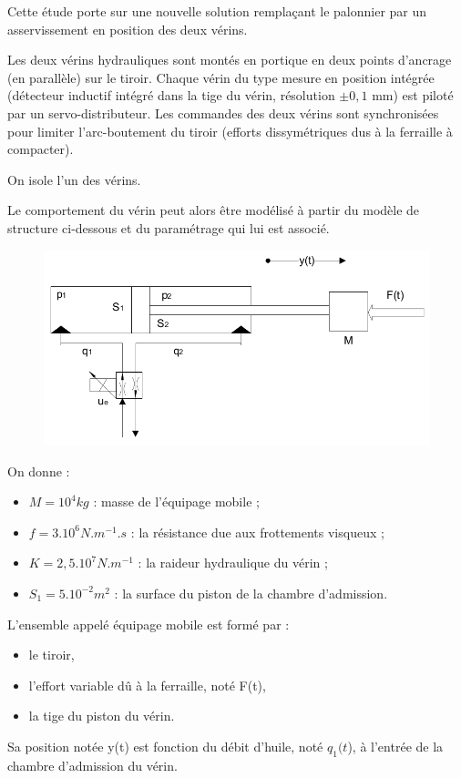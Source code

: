 Cette étude porte sur une nouvelle solution remplaçant le palonnier par un asservissement en position des deux vérins.

Les deux vérins hydrauliques sont montés en portique en deux points d'ancrage (en parallèle) sur le tiroir. Chaque vérin du type \og mesure en position intégrée \fg (détecteur inductif intégré dans la tige du vérin, résolution $\pm 0,1$ mm) est piloté par un servo-distributeur. Les commandes des deux vérins sont synchronisées pour limiter l'arc-boutement du tiroir (efforts dissymétriques dus à la ferraille à compacter).

On isole l'un des vérins.

Le comportement du vérin peut alors être modélisé à partir du modèle de structure ci-dessous et du paramétrage qui lui est associé.

\begin{figure}[!h]
 \centering\includegraphics[width=0.7\linewidth]{img/fig3.png}
\end{figure}

On donne :
\begin{itemize}
 \item $M=10^4kg$ : masse de l'équipage mobile ;
 \item $f=3.10^6N.m^{-1}.s$ : la résistance due aux frottements visqueux ;
 \item $K=2,5.10^7N.m^{-1}$ : la raideur hydraulique du vérin ;
 \item $S_1=5.10^{-2}m^2$ : la surface du piston de la chambre d'admission.
\end{itemize}

L'ensemble appelé \og équipage mobile \fg est formé par :
\begin{itemize}
 \item le tiroir,
 \item l'effort variable dû à la ferraille, noté F(t),
 \item la tige du piston du vérin.
\end{itemize}

Sa position notée y(t) est fonction du débit d'huile, noté $q_1(t$), à l'entrée de la chambre d'admission du vérin.

